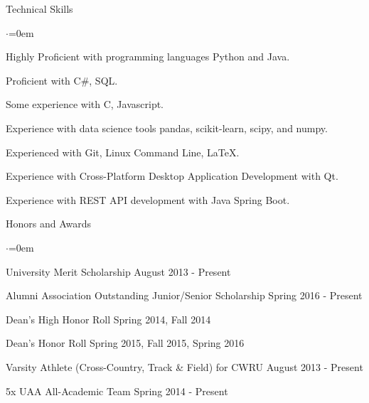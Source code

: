 \documentclass{resume} %
\begin{document}

\begin{rSection}{Technical Skills}
\begin{list}{$\cdot$}{\leftmargin=0em}
\item Highly Proficient with programming languages Python and Java.
\vspace{-0.5em}
\item Proficient with C\#, SQL.
\vspace{-0.5em}
\item Some experience with C, Javascript.
\vspace{-0.5em}
\item Experience with data science tools pandas, scikit-learn, scipy, and numpy.
\vspace{-0.5em}
\item Experienced with Git, Linux Command Line, LaTeX.
\vspace{-0.5em}
\item Experience with Cross-Platform Desktop Application Development with Qt.
\vspace{-0.5em}
\item Experience with REST API development with Java Spring Boot.
\vspace{-0.5em}
\end{list}
\end{rSection}


\begin{rSection}{Honors and Awards}
\begin{list}{$\cdot$}{\leftmargin=0em}
\item University Merit Scholarship \hfill August 2013 - Present
\vspace{-0.5em}
\item Alumni Association Outstanding Junior/Senior Scholarship \hfill Spring 2016 - Present
\vspace{-0.5em}
\item Dean's High Honor Roll \hfill Spring 2014, Fall 2014
\vspace{-0.5em}
\item Dean's Honor Roll \hfill Spring 2015, Fall 2015, Spring 2016
\vspace{-0.5em}
\item Varsity Athlete (Cross-Country, Track \& Field) for CWRU \hfill{August 2013 - Present}
\vspace{-0.5em}
\item 5x UAA All-Academic Team \hfill{Spring 2014 - Present}
\vspace{-0.5em}
\end{list}


\end{rSection}

\end{document}
